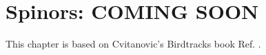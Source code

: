 \chapter{Spinors: COMING SOON}
\label{ch-spinors}

This chapter is based on Cvitanovic's Birdtracks book Ref. \cite{birdtracks-book}.